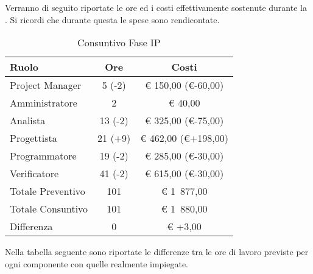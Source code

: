 			Verranno di seguito riportate le ore ed i costi effettivamente sostenute durante la . Si ricordi che durante questa  le spese sono rendicontate.
			\begin{table}[H]
				\begin{center}
					\begin{tabular}{| l | c | c |}
								\hline
								Ruolo 				& Ore 		& Costi  \\ \hline
							
								Project Manager		& 5 (-2)		& \euro{} 150,00 (\euro{}-60,00) 	\\
								Amministratore 		& 2 			& \euro{} 40,00 	\\
								Analista			& 13 (-2)		& \euro{} 325,00 (\euro{}-75,00)	\\
								Progettista 		& 21 (+9)		& \euro{} 462,00 (\euro{}+198,00) 	\\
								Programmatore		& 19 (-2)		& \euro{} 285,00 (\euro{}-30,00)	\\
								Verificatore		& 41 (-2)		& \euro{} 615,00 (\euro{}-30,00)	\\ \hline \hline
									
								Totale Preventivo 	& 101 			& \euro{} 1~877,00 	\\ \hline
								Totale Consuntivo	& 101			& \euro{} 1~880,00 	\\ \hline
								Differenza			& 0				& \euro{} +3,00 	\\ \hline
							\end{tabular}
				\end{center}
				\caption{Consuntivo Fase IP}
			\end{table}


			Nella tabella seguente sono riportate le differenze tra le ore di lavoro previste per ogni componente con quelle realmente impiegate.

